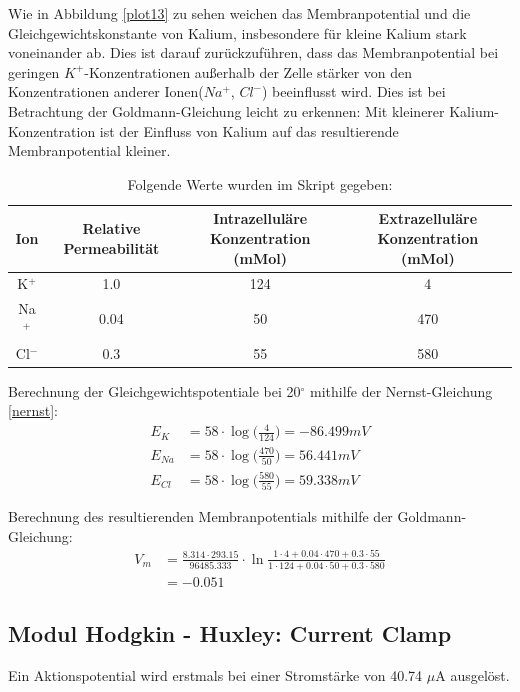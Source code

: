 \documentclass[11pt]{article}
\begin{document}
Wie in Abbildung \ref{plot13} zu sehen weichen das Membranpotential und die Gleichgewichtskonstante von Kalium, insbesondere für kleine Kalium stark voneinander ab. Dies ist darauf zurückzuführen, dass das Membranpotential bei geringen $K^+$-Konzentrationen außerhalb der Zelle stärker von den Konzentrationen anderer Ionen($Na^+$, $Cl^-$) beeinflusst wird. Dies ist bei Betrachtung der Goldmann-Gleichung leicht zu erkennen: Mit kleinerer Kalium-Konzentration ist der Einfluss von Kalium auf das resultierende Membranpotential kleiner. 

\begin{table}[H]
\caption{Folgende Werte wurden im Skript gegeben:}
\centering
\begin{adjustbox}{width=1.3\textwidth, center=\textwidth}
\begin{tabular}{c|c|c|c}
Ion & Relative Permeabilität & Intrazelluläre Konzentration (mMol) & Extrazelluläre Konzentration (mMol)\\ \hline\hline
K$^+$ & 1.0 & 124 & 4 \\ 
Na$^+$ & 0.04 & 50 & 470 \\
Cl$^-$ & 0.3 & 55 & 580
\end{tabular}
\end{adjustbox}
\label{werte-skript}
\end{table}

Berechnung der Gleichgewichtspotentiale bei 20$^\circ$ mithilfe der Nernst-Gleichung \ref{nernst}:
\begin{align}
E_K &= 58\cdot\log\bigg(\frac{4}{124}\bigg)= -86.499 mV\\
E_{Na} &= 58\cdot\log\bigg(\frac{470}{50}\bigg)=  56.441 mV\\
E_{Cl} &= 58\cdot\log\bigg(\frac{580}{55}\bigg)= 59.338 mV
\end{align}

Berechnung des resultierenden Membranpotentials mithilfe der Goldmann-Gleichung:
\begin{align}
V_m&=\frac{8.314\cdot 293.15}{96485.333}\cdot\ln\frac{1\cdot 4+0.04\cdot470+0.3\cdot55}{1\cdot 124+0.04\cdot50+0.3\cdot580}\\
&= -0.051
\end{align}

\subsection{Modul Hodgkin - Huxley: Current Clamp}
Ein Aktionspotential wird erstmals bei einer Stromstärke von 40.74 $\mu$A ausgelöst.
\end{document}
